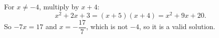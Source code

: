 For $x\ne-4$, multiply by $x+4$:
\[
x^2+2x+3=(x+5)(x+4)=x^2+9x+20 .
\]
So $-7x=17$ and $x=\boxed{-\dfrac{17}{7}}$, which is not $-4$, so it is a valid solution.
